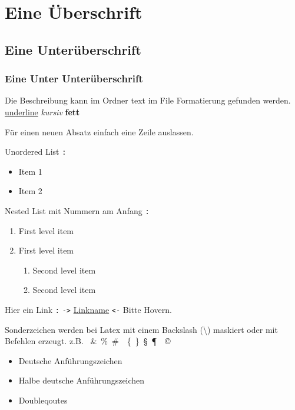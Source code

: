 \section{Eine Überschrift}
\label{sec:Eine_Überschrift}

\subsection{Eine Unterüberschrift}

\subsubsection{Eine Unter Unterüberschrift}

Die Beschreibung kann im Ordner text im File Formatierung gefunden werden.
\underline{underline} \textit{kursiv} \textbf{fett}

Für einen neuen Absatz einfach eine Zeile auslassen.

Unordered List \verb-:-
\begin{itemize}
    \item  Item 1
    \item  Item 2
\end{itemize}

Nested List mit Nummern am Anfang \verb-:-
\begin{enumerate}
    \item First level item
    \item First level item
    \begin{enumerate}
        \item Second level item
        \item Second level item
    \end{enumerate}
\end{enumerate}

Hier ein Link \verb-:- \verb+->+
\href{http://detexify.kirelabs.org/classify.html}{Linkname}
\verb+<-+ Bitte Hovern.

Sonderzeichen werden bei Latex mit einem Backslash (\textbackslash) maskiert oder mit Befehlen erzeugt. z.B. \textdollar\ \&\ \%\ \#\ \textbar\ \{\ \}\ \S\ \P\ \textbullet\ \copyright\

\begin{itemize}
    \item \glqq Deutsche Anführungszeichen\grqq
    \item \glq Halbe deutsche Anführungszeichen\grq
    \item \dq Doubleqoutes\dq
\end{itemize}

